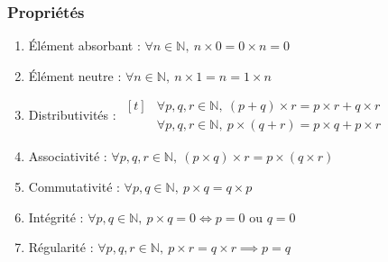 \subsubsection{Propriétés}
%
\begin{theorem}
\par\noindent
%
\begin{enumerate}
\item Élément absorbant : \(∀𝑛∈ℕ,\ 𝑛×0=0×𝑛=0\) 
\item Élément neutre : \(∀𝑛∈ℕ,\ 𝑛×1=𝑛=1×𝑛\) 
\item Distributivités : \(
\begin{aligned}[t]
&∀𝑝,𝑞,𝑟∈ℕ,\ (𝑝+𝑞)×𝑟=𝑝×𝑟+𝑞×𝑟
\\
&∀𝑝,𝑞,𝑟∈ℕ,\ 𝑝×(𝑞+𝑟)=𝑝×𝑞+𝑝×𝑟
\end{aligned}
\)
\item Associativité : \(∀𝑝,𝑞,𝑟∈ℕ,\ (𝑝×𝑞)×𝑟=𝑝×(𝑞×𝑟)\) 
\item Commutativité : \(∀𝑝,𝑞∈ℕ,\ 𝑝×𝑞=𝑞×𝑝\) 
\item Intégrité : \(∀𝑝,𝑞∈ℕ,\ 𝑝×𝑞=0⇔𝑝=0\text{ ou }𝑞=0\) 
\item Régularité : \(∀𝑝,𝑞,𝑟∈ℕ,\ 𝑝×𝑟=𝑞×𝑟⟹𝑝=𝑞\) 
\end{enumerate}
\end{theorem}
%
